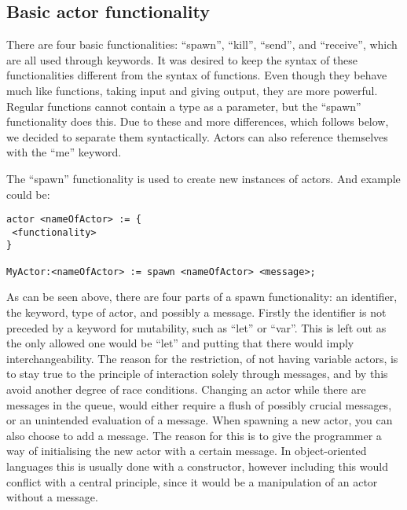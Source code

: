 \subsection{Basic actor functionality}

There are four basic functionalities: \enquote{spawn}, \enquote{kill}, \enquote{send}, and \enquote{receive}, which are all used through keywords. It was desired to keep the syntax of these functionalities different from the syntax of functions. Even though they behave much like functions, taking input and giving output, they are more powerful. Regular functions cannot contain a type as a parameter, but the \enquote{spawn} functionality does this. Due to these and more differences, which follows below, we decided to separate them syntactically. Actors can also reference themselves with the \enquote{me} keyword.

The \enquote{spawn} functionality is used to create new instances of actors. And example could be:

\label{actorfuncSpawn}
\begin{lstlisting}
actor <nameOfActor> := {
 <functionality>
}

MyActor:<nameOfActor> := spawn <nameOfActor> <message>;
\end{lstlisting}

As can be seen above, there are four parts of a spawn functionality: an identifier, the keyword, type of actor, and possibly a message. Firstly the identifier is not preceded by a keyword for mutability, such as \enquote{let} or \enquote{var}. This is left out as the only allowed one would be \enquote{let} and putting that there would imply interchangeability. The reason for the restriction, of not having variable actors, is to stay true to the principle of interaction solely through messages, and by this avoid another degree of race conditions. Changing an actor while there are messages in the queue, would either require a flush of possibly crucial messages, or an unintended evaluation of a message. When spawning a new actor, you can also choose to add a message. The reason for this is to give the programmer a way of initialising the new actor with a certain message. In object-oriented languages this is usually done with a constructor, however including this would conflict with a central principle, since it would be a manipulation of an actor without a message.


